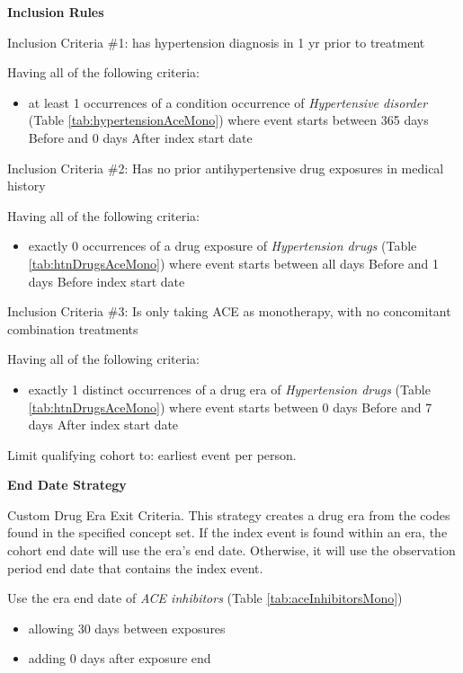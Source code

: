 \documentclass[11pt]{book}
\providecommand{\tightlist}{%
  \setlength{\itemsep}{0pt}\setlength{\parskip}{0pt}}
\theoremstyle{definition}
\theoremstyle{definition}
\theoremstyle{definition}
\theoremstyle{remark}
\begin{document}
\textbf{Inclusion Rules}

Inclusion Criteria \#1: has hypertension diagnosis in 1 yr prior to treatment

Having all of the following criteria:

\begin{itemize}
\tightlist
\item
  at least 1 occurrences of a condition occurrence of \emph{Hypertensive disorder} (Table \ref{tab:hypertensionAceMono}) where event starts between 365 days Before and 0 days After index start date
\end{itemize}

Inclusion Criteria \#2: Has no prior antihypertensive drug exposures in medical history

Having all of the following criteria:

\begin{itemize}
\tightlist
\item
  exactly 0 occurrences of a drug exposure of \emph{Hypertension drugs} (Table \ref{tab:htnDrugsAceMono}) where event starts between all days Before and 1 days Before index start date
\end{itemize}

Inclusion Criteria \#3: Is only taking ACE as monotherapy, with no concomitant combination treatments

Having all of the following criteria:

\begin{itemize}
\tightlist
\item
  exactly 1 distinct occurrences of a drug era of \emph{Hypertension drugs} (Table \ref{tab:htnDrugsAceMono}) where event starts between 0 days Before and 7 days After index start date
\end{itemize}

Limit qualifying cohort to: earliest event per person.

\textbf{End Date Strategy}

Custom Drug Era Exit Criteria.
This strategy creates a drug era from the codes found in the specified concept set. If the index event is found within an era, the cohort end date will use the era's end date. Otherwise, it will use the observation period end date that contains the index event.

Use the era end date of \emph{ACE inhibitors} (Table \ref{tab:aceInhibitorsMono})

\begin{itemize}
\tightlist
\item
  allowing 30 days between exposures
\item
  adding 0 days after exposure end
\end{itemize}
\end{document}
